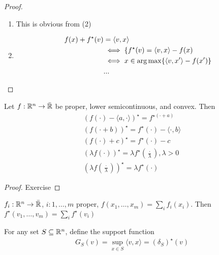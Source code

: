 \begin{proof}
  \begin{enumerate}
  \item This is obvious from (2)
  \item
    \begin{align}
      \label{eq:59}
      f(x) + f^{\star}(v) &= \langle v, x \rangle \\
      &\iff \{ f^{\star}(v) = \langle v, x \rangle - f(x)  \\
      &\iff x \in \operatorname*{arg\,max} \{ \langle v, x' \rangle - f(x') \}  \\
      &...
    \end{align}
  \end{enumerate}
\end{proof}

\begin{proposition}
  Let $f: \mathbb{R}^{n} \rightarrow \bar {\mathbb{R}}$ be proper, lower semicontinuous,
  and convex.  Then
  \begin{align}
    (f(\cdot) - \langle a, \cdot \rangle)^{\star} = f^{\star(\cdot +
      a)} \\
    (f(\cdot + b))^{\star} = f^{\star}(\cdot) - \langle \cdot, b
    \rangle \\
    (f(\cdot) + c)^{\star} = f^{\star}(\cdot) - c \\
    (\lambda f(\cdot))^{\star} = \lambda
    f^{\star}(\frac{\cdot}{\lambda}), \lambda > 0 \\
    (\lambda f(\frac{\cdot}{\lambda}))^{\star} = \lambda f^{\star}(\cdot)
  \end{align}
\end{proposition}

\begin{proof}
  Exercise
\end{proof}

\begin{proposition}
  $f_{i}: \mathbb{R}^{n} \rightarrow \bar {\mathbb{R}}$, $i: 1, \dots, m$ proper,
  $f(x_{1}, \dots, x_{m}) = \sum_{i} f_{i}(x_{i})$.  Then
  $f^{\star}(v_{1}, \dots, v_{m}) = \sum_{i} f^{\star}(v_{i})$
\end{proposition}

\begin{defn}
  \label{defn:conjugate_functions:8}
  For any set $S \subseteq \mathbb{R}^{n}$, define the support function
  \begin{align}
    \label{eq:63}
    G_{S}(v) = \sup_{x \in S} \langle v, x \rangle = (\delta_{S})^{\star}(v)
  \end{align}
\end{defn}

